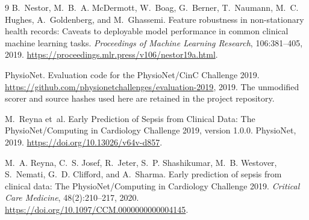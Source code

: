 \documentclass{article}
\begin{document}
\label{lastcontent}

\clearpage
\begin{thebibliography}{9}
B.~Nestor, M.~B.~A. McDermott, W.~Boag, G.~Berner, T.~Naumann, M.~C. Hughes, A.~Goldenberg, and M.~Ghassemi.
Feature robustness in non-stationary health records: Caveats to deployable model performance in common clinical machine learning tasks.
\emph{Proceedings of Machine Learning Research}, 106:381--405, 2019.
\url{https://proceedings.mlr.press/v106/nestor19a.html}.

PhysioNet. Evaluation code for the PhysioNet/CinC Challenge 2019.
\url{https://github.com/physionetchallenges/evaluation-2019}, 2019.
The unmodified scorer and source hashes used here are retained in the project repository.

M.~Reyna et~al.
Early Prediction of Sepsis from Clinical Data: The PhysioNet/Computing in Cardiology Challenge 2019, version 1.0.0.
PhysioNet, 2019.
\url{https://doi.org/10.13026/v64v-d857}.

M.~A. Reyna, C.~S. Josef, R.~Jeter, S.~P. Shashikumar, M.~B. Westover, S.~Nemati, G.~D. Clifford, and A.~Sharma.
Early prediction of sepsis from clinical data: The PhysioNet/Computing in Cardiology Challenge 2019.
\emph{Critical Care Medicine}, 48(2):210--217, 2020.
\url{https://doi.org/10.1097/CCM.0000000000004145}.
\end{thebibliography}
\end{document}
